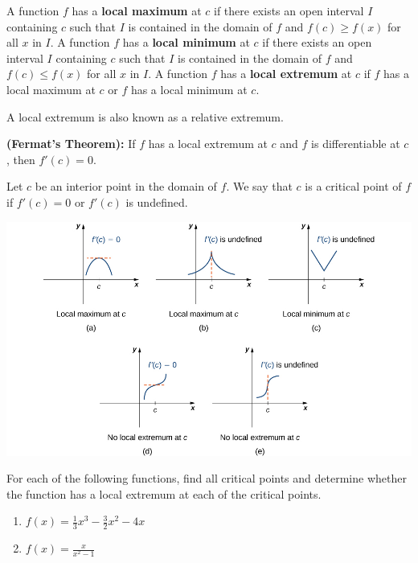 \begin{definition}

A function \(f\) has a \textbf{local maximum} at \(c\) if there exists
an open interval \(I\) containing \(c\) such that \(I\) is contained in
the domain of \(f\) and \(f(c)\ge f(x)\) for all \(x\) in \(I\). A function
\(f\) has a \textbf{local minimum} at \(c\) if there exists an open
interval \(I\) containing \(c\) such that \(I\) is contained in the
domain of \(f\) and \(f(c) \le f(x)\) for all \(x\) in \(I\). A function
\(f\) has a \textbf{local extremum} at \(c\) if \(f\) has a local
maximum at \(c\) or \(f\) has a local minimum at \(c\).

A local extremum is also known as a relative extremum.

\end{definition}

\begin{theorem}

\textbf{(Fermat's Theorem):} If \(f\) has a local extremum at \(c\) and
\(f\) is differentiable at \(c\), then \(f'(c)=0.\)

\end{theorem}

\begin{definition}

Let \(c\) be an interior point in the domain of \(f\). We say that \(c\)
is a critical point of \(f\) if \(f'(c)=0\) or \(f'(c)\) is undefined.

\begin{fullwidth}
  \centering
  \includegraphics[width=0.8\linewidth]{img/CNX_Calc_Figure_04_03_004.jpeg}
\end{fullwidth}

\end{definition}

\begin{example}

For each of the following functions, find all critical points and
determine whether the function has a local extremum at each of the
critical points.

\begin{enumerate}
\item
  \(f(x)=\frac{1}{3}x^3 - \frac{3}{2}x^2-4x\)
\item
  \(f(x)=\frac{x}{x^2-1}\)
\end{enumerate}

\end{example}

